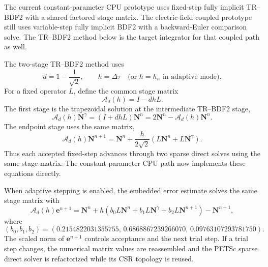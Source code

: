 \documentclass[11pt]{article}
\begin{document}
The current constant-parameter CPU prototype uses fixed-step fully implicit TR--BDF2
with a shared factored stage matrix.  The electric-field coupled prototype still uses
variable-step fully implicit BDF2 with a backward-Euler comparison solve.  The TR--BDF2
method below is the target integrator for that coupled path as well.

The two-stage TR--BDF2 method uses
\begin{equation}
 d=1-\frac{1}{\sqrt{2}},\qquad h=\Delta\tau
 \quad\text{(or }h=h_n\text{ in adaptive mode)}.
 \label{eq:trbdf2_parameter}
\end{equation}
For a fixed operator $L$, define the common stage matrix
\begin{equation}
 \mathcal A_d(h)=I-dhL.
 \label{eq:trbdf2_stage_matrix}
\end{equation}
The first stage is the trapezoidal solution at the intermediate TR--BDF2 stage,
\begin{equation}
 \boxed{
 \mathcal A_d(h)\bm N^\gamma
 =\left(I+dhL\right)\bm N^n
 =2\bm N^n-\mathcal A_d(h)\bm N^n.
 }
 \label{eq:trbdf2_stage1}
\end{equation}
The endpoint stage uses the same matrix,
\begin{equation}
 \boxed{
 \mathcal A_d(h)\bm N^{n+1}
 =\bm N^n+\frac{h}{2\sqrt{2}}
   \left(L\bm N^n+L\bm N^\gamma\right).
 }
 \label{eq:trbdf2_stage2}
\end{equation}
Thus each accepted fixed-step advances through two sparse direct solves using the same
stage matrix.  The constant-parameter CPU path now implements these equations directly.

When adaptive stepping is enabled, the embedded error estimate solves the same stage
matrix with
\begin{equation}
 \mathcal A_d(h)\bm e^{n+1}
 =\bm N^n+h\left(
 b_0L\bm N^n+b_1L\bm N^\gamma+b_2L\bm N^{n+1}
 \right)-\bm N^{n+1},
 \label{eq:trbdf2_error}
\end{equation}
where
\begin{equation}
 (b_0,b_1,b_2)=
 (0.2154822031355755,\,0.6868867239266070,\,0.09763107293781750).
 \label{eq:trbdf2_error_weights}
\end{equation}
The scaled norm of $\bm e^{n+1}$ controls acceptance and the next trial step.  If a
trial step changes, the numerical matrix values are reassembled and the PETSc sparse
direct solver is refactorized while its CSR topology is reused.
\end{document}
